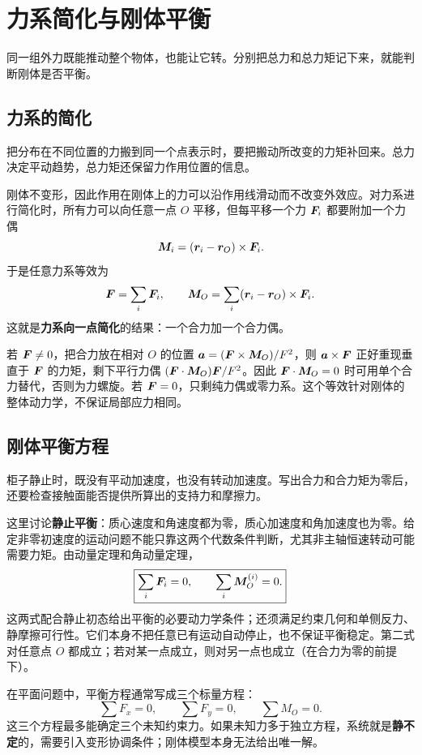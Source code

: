 \section{力系简化与刚体平衡}

同一组外力既能推动整个物体，也能让它转。分别把总力和总力矩记下来，就能判断刚体是否平衡。

\subsection{力系的简化}

把分布在不同位置的力搬到同一个点表示时，要把搬动所改变的力矩补回来。总力决定平动趋势，总力矩还保留力作用位置的信息。

刚体不变形，因此作用在刚体上的力可以沿作用线滑动而不改变外效应。对力系进行简化时，所有力可以向任意一点 \(O\) 平移，但每平移一个力 \(\boldsymbol{F}_i\) 都要附加一个力偶
\[
\boldsymbol{M}_i=(\boldsymbol{r}_i-\boldsymbol{r}_O)\times\boldsymbol{F}_i.
\]
于是任意力系等效为
\[
\boldsymbol{F}=\sum_i\boldsymbol{F}_i,
\qquad
\boldsymbol{M}_O=\sum_i(\boldsymbol{r}_i-\boldsymbol{r}_O)\times\boldsymbol{F}_i.
\]
这就是\textbf{力系向一点简化}的结果：一个合力加一个合力偶。

若 $\boldsymbol{F}\ne0$，把合力放在相对 $O$ 的位置 $\boldsymbol{a}=(\boldsymbol{F}\times\boldsymbol{M}_O)/F^2$，则 $\boldsymbol{a}\times\boldsymbol{F}$ 正好重现垂直于 $\boldsymbol{F}$ 的力矩，剩下平行力偶 $(\boldsymbol{F}\cdot\boldsymbol{M}_O)\boldsymbol{F}/F^2$。因此 $\boldsymbol{F}\cdot\boldsymbol{M}_O=0$ 时可用单个合力替代，否则为力螺旋。若 $\boldsymbol{F}=0$，只剩纯力偶或零力系。这个等效针对刚体的整体动力学，不保证局部应力相同。

\subsection{刚体平衡方程}

柜子静止时，既没有平动加速度，也没有转动加速度。写出合力和合力矩为零后，还要检查接触面能否提供所算出的支持力和摩擦力。

这里讨论\textbf{静止平衡}：质心速度和角速度都为零，质心加速度和角加速度也为零。给定非零初速度的运动问题不能只靠这两个代数条件判断，尤其非主轴恒速转动可能需要力矩。由动量定理和角动量定理，
\begin{equation}
\boxed{
\sum_i\boldsymbol{F}_i=0,\qquad
\sum_i\boldsymbol{M}_O^{(i)}=0.
}
\label{eq:rigid-equilibrium}
\end{equation}
这两式配合静止初态给出平衡的必要动力学条件；还须满足约束几何和单侧反力、静摩擦可行性。它们本身不把任意已有运动自动停止，也不保证平衡稳定。第二式对任意点 \(O\) 都成立；若对某一点成立，则对另一点也成立（在合力为零的前提下）。

在平面问题中，平衡方程通常写成三个标量方程：
\[
\sum F_x=0,\qquad
\sum F_y=0,\qquad
\sum M_O=0.
\]
这三个方程最多能确定三个未知约束力。如果未知力多于独立方程，系统就是\textbf{静不定}的，需要引入变形协调条件；刚体模型本身无法给出唯一解。

